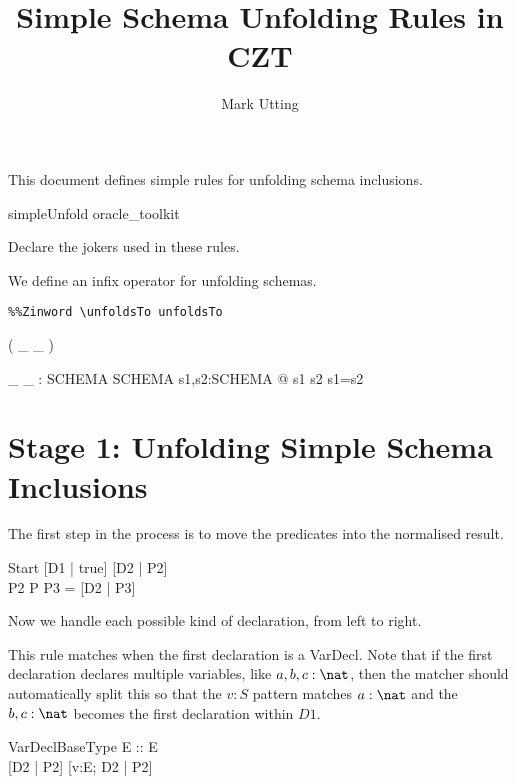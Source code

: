 \documentclass{article}
\title{Simple Schema Unfolding Rules in CZT}
\author{Mark Utting}
\begin{document}
\maketitle

This document defines simple rules for unfolding schema inclusions.

\begin{zsection}
  \SECTION simpleUnfold \parents oracle\_toolkit
\end{zsection}

Declare the jokers used in these rules.

We define an infix operator for unfolding schemas.

\newcommand{\unfoldsTo}{\mathrel{\leadsto}}

\begin{verbatim}
%%Zinword \unfoldsTo unfoldsTo
\end{verbatim}

\begin{zed}
  \relation ( \_ \unfoldsTo \_ )
\end{zed}

\begin{gendef}[SCHEMA]
  \_ \unfoldsTo \_ : SCHEMA \rel SCHEMA
\where
  \forall s1,s2:SCHEMA @ s1 \unfoldsTo s2 \iff s1=s2
\end{gendef}


\section*{Stage 1: Unfolding Simple Schema Inclusions}

The first step in the process is to move the predicates into
the normalised result.
\begin{zedrule}{Start}
   [D1 | true] \unfoldsTo [D2 | P2] \\
   P2 \land P \iff P3
\derives
   [D1 | P] = [D2 | P3]
\end{zedrule}

Now we handle each possible kind of declaration, from left to right.

This rule matches when the first declaration is a VarDecl.
Note that if the first declaration declares multiple variables,
like $a,b,c:\nat$, then the matcher should automatically split this
so that the $v:S$ pattern matches $a:\nat$ and the $b,c:\nat$
becomes the first declaration within $D1$.

\begin{zedrule}{VarDeclBaseType}
   E :: \power E \\
   [D1 | true] \unfoldsTo [D2 | P2]
\derives
   [v:E; D1 | true] \unfoldsTo [v:E; D2 | P2]
\end{zedrule}
\end{document}
